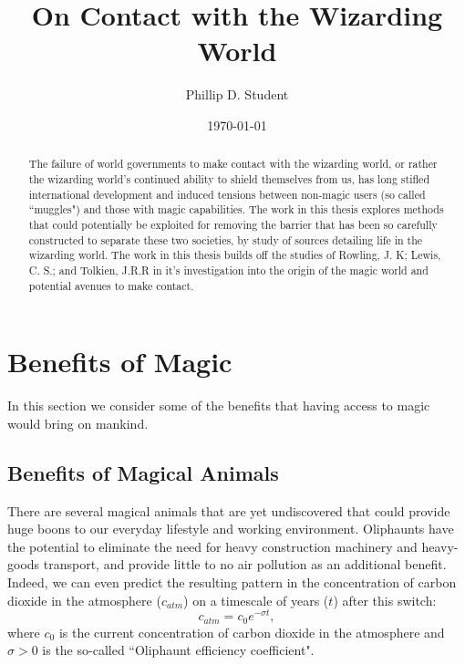 \documentclass[]{article}
\title{On Contact with the Wizarding World}
\author{Phillip D. Student}
\date{\today}
\begin{document}
 
\maketitle %
 
\begin{abstract}
The failure of world governments to make contact with the wizarding world, or rather the wizarding world's continued ability to shield themselves from us, has long stifled international development and induced tensions between non-magic users (so called ``muggles") and those with magic capabilities.
The work in this thesis explores methods that could potentially be exploited for removing the barrier that has been so carefully constructed to separate these two societies, by study of sources detailing life in the wizarding world.
The work in this thesis builds off the studies of Rowling, J. K; Lewis, C. S.; and Tolkien, J.R.R in it's investigation into the origin of the magic world and potential avenues to make contact.
\end{abstract}

\section{Benefits of Magic} \label{sec:BenefitsOfMagic}
In this section we consider some of the benefits that having access to magic would bring on mankind.

\subsection{Benefits of Magical Animals} \label{sec:Animals}
There are several magical animals that are yet undiscovered \cite{rowling2001fantastic} that could provide huge boons to our everyday lifestyle and working environment.
Oliphaunts \cite{tolkien2012lord} have the potential to eliminate the need for heavy construction machinery and heavy-goods transport, and provide little to no air pollution as an additional benefit.
Indeed, we can even predict the resulting pattern in the concentration of carbon dioxide in the atmosphere ($c_{atm}$) on a timescale of years ($t$) after this switch:
\begin{equation} \label{eq:CO2Reduction}
    c_{atm} = c_{0} e^{-\sigma t},
\end{equation}
where $c_{0}$ is the current concentration of carbon dioxide in the atmosphere and $\sigma>0$ is the so-called ``Oliphaunt efficiency coefficient". \newline
\end{document}
